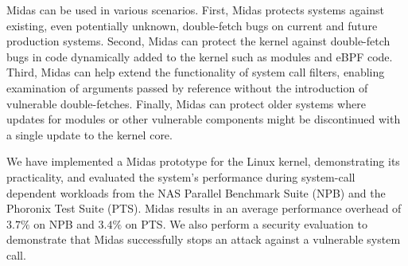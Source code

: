 Midas can be used in various scenarios. 
First, Midas protects systems against existing, even potentially unknown,
double-fetch bugs on current and future production systems.
Second, Midas can protect the kernel against double-fetch bugs in code
dynamically added to the kernel such as modules and eBPF code.
Third, Midas can help extend the functionality of system call filters,
enabling examination of arguments passed by reference without the introduction
of vulnerable double-fetches.
Finally, Midas can protect older systems where updates for modules or other
vulnerable components might be discontinued with a single update to the
kernel core.

We have implemented a Midas prototype for the Linux kernel, demonstrating its
practicality, and evaluated the system's performance during system-call
dependent workloads from the NAS Parallel Benchmark Suite (NPB) and the
Phoronix Test Suite (PTS).
Midas results in an average performance overhead of $3.7\%$ on NPB and
$3.4\%$ on PTS.
We also perform a security evaluation to demonstrate that Midas successfully
stops an attack against a vulnerable system call.

